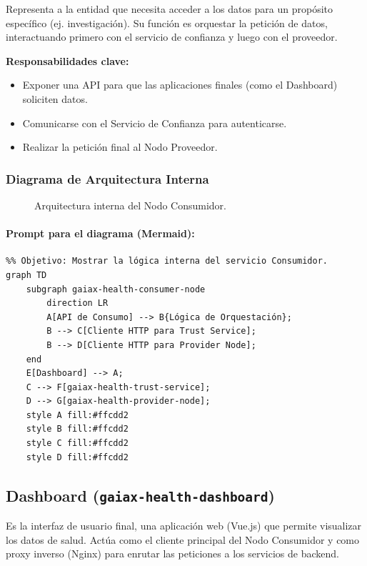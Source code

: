 Representa a la entidad que necesita acceder a los datos para un propósito específico (ej. investigación). Su función es orquestar la petición de datos, interactuando primero con el servicio de confianza y luego con el proveedor.

\textbf{Responsabilidades clave:}
\begin{itemize}
    \item Exponer una API para que las aplicaciones finales (como el Dashboard) soliciten datos.
    \item Comunicarse con el Servicio de Confianza para autenticarse.
    \item Realizar la petición final al Nodo Proveedor.
\end{itemize}

\subsubsection*{Diagrama de Arquitectura Interna}
\begin{figure}[H]
    \centering
    \caption{Arquitectura interna del Nodo Consumidor.}
    \label{fig:consumer_arch}
\end{figure}

\paragraph{Prompt para el diagrama (Mermaid):}
\begin{verbatim}
%% Objetivo: Mostrar la lógica interna del servicio Consumidor.
graph TD
    subgraph gaiax-health-consumer-node
        direction LR
        A[API de Consumo] --> B{Lógica de Orquestación};
        B --> C[Cliente HTTP para Trust Service];
        B --> D[Cliente HTTP para Provider Node];
    end
    E[Dashboard] --> A;
    C --> F[gaiax-health-trust-service];
    D --> G[gaiax-health-provider-node];
    style A fill:#ffcdd2
    style B fill:#ffcdd2
    style C fill:#ffcdd2
    style D fill:#ffcdd2
\end{verbatim}

\subsection{Dashboard (\texttt{gaiax-health-dashboard})}

Es la interfaz de usuario final, una aplicación web (Vue.js) que permite visualizar los datos de salud. Actúa como el cliente principal del Nodo Consumidor y como proxy inverso (Nginx) para enrutar las peticiones a los servicios de backend.

